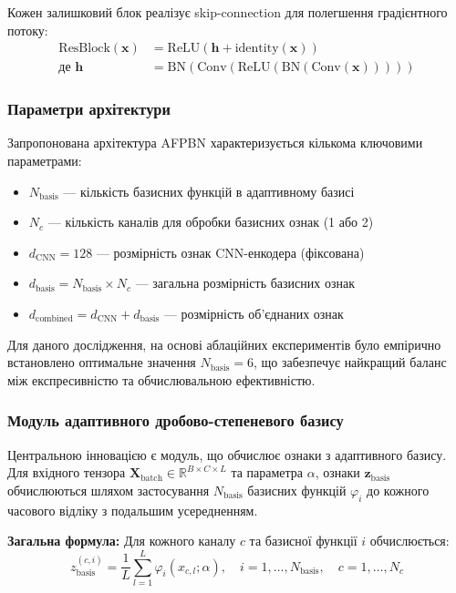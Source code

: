\documentclass[12pt,a4paper]{article}
\begin{document}
Кожен залишковий блок реалізує skip-connection для полегшення градієнтного потоку:
\begin{align}
	\text{ResBlock}(\mathbf{x}) &= \text{ReLU}(\mathbf{h} + \text{identity}(\mathbf{x})) \\
	\text{де } \mathbf{h} &= \text{BN}(\text{Conv}(\text{ReLU}(\text{BN}(\text{Conv}(\mathbf{x})))))
\end{align}

\subsubsection{Параметри архітектури}
\label{sec:architecture_parameters}

Запропонована архітектура AFPBN характеризується кількома ключовими параметрами:

\begin{itemize}
	\item $N_{\text{basis}}$ — кількість базисних функцій в адаптивному базисі
	\item $N_c$ — кількість каналів для обробки базисних ознак (1 або 2)
	\item $d_{\text{CNN}} = 128$ — розмірність ознак CNN-енкодера (фіксована)
	\item $d_{\text{basis}} = N_{\text{basis}} \times N_c$ — загальна розмірність базисних ознак
	\item $d_{\text{combined}} = d_{\text{CNN}} + d_{\text{basis}}$ — розмірність об'єднаних ознак
\end{itemize}

Для даного дослідження, на основі аблаційних експериментів було емпірично встановлено оптимальне значення $N_{\text{basis}} = 6$, що забезпечує найкращий баланс між експресивністю та обчислювальною ефективністю.

\subsubsection{Модуль адаптивного дробово-степеневого базису}

Центральною інновацією є модуль, що обчислює ознаки з адаптивного базису. Для вхідного тензора $\mathbf{X}_{\text{batch}} \in \mathbb{R}^{B \times C \times L}$ та параметра $\alpha$, ознаки $\mathbf{z}_{\text{basis}}$ обчислюються шляхом застосування $N_{\text{basis}}$ базисних функцій $\varphi_i$ до кожного часового відліку з подальшим усередненням.

\textbf{Загальна формула:} Для кожного каналу $c$ та базисної функції $i$ обчислюється:
\begin{equation}
	z_{\text{basis}}^{(c,i)} = \frac{1}{L} \sum_{l=1}^L \varphi_i(x_{c,l}; \alpha), \quad i = 1, \ldots, N_{\text{basis}}, \quad c = 1, \ldots, N_c
\end{equation}
\end{document}
